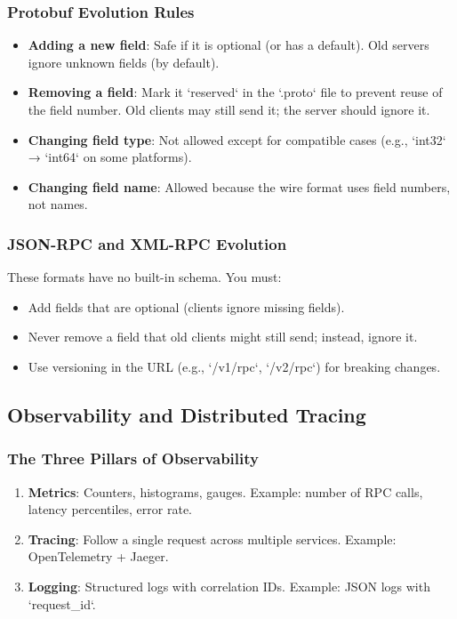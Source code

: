 \documentclass[10pt,a4paper]{article}
\begin{document}
\subsubsection{Protobuf Evolution Rules}
\begin{itemize}
    \item \textbf{Adding a new field}: Safe if it is optional (or has a default). Old servers ignore unknown fields (by default).
    \item \textbf{Removing a field}: Mark it `reserved` in the `.proto` file to prevent reuse of the field number. Old clients may still send it; the server should ignore it.
    \item \textbf{Changing field type}: Not allowed except for compatible cases (e.g., `int32` → `int64` on some platforms).
    \item \textbf{Changing field name}: Allowed because the wire format uses field numbers, not names.
\end{itemize}

\subsubsection{JSON-RPC and XML-RPC Evolution}
These formats have no built-in schema. You must:
\begin{itemize}
    \item Add fields that are optional (clients ignore missing fields).
    \item Never remove a field that old clients might still send; instead, ignore it.
    \item Use versioning in the URL (e.g., `/v1/rpc`, `/v2/rpc`) for breaking changes.
\end{itemize}

\subsection{Observability and Distributed Tracing}

\subsubsection{The Three Pillars of Observability}
\begin{enumerate}
    \item \textbf{Metrics}: Counters, histograms, gauges. Example: number of RPC calls, latency percentiles, error rate.
    \item \textbf{Tracing}: Follow a single request across multiple services. Example: OpenTelemetry + Jaeger.
    \item \textbf{Logging}: Structured logs with correlation IDs. Example: JSON logs with `request\_id`.
\end{enumerate}
\end{document}
